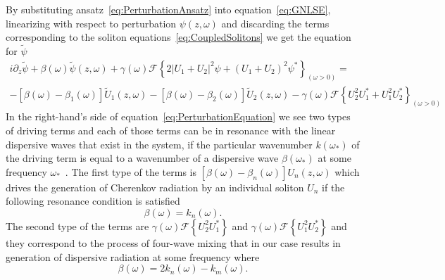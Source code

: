 \documentclass[aps, prl, twocolumn, superscriptaddress, final]{revtex4}
\newcommand{\abs}[1]{\left| #1 \right|}
\begin{document}
\begin{widetext}
By substituting ansatz~\eqref{eq:PerturbationAnsatz} into equation~\eqref{eq:GNLSE}, linearizing with respect to perturbation $\psi(z, \omega)$ and discarding the terms corresponding to the soliton equations~\eqref{eq:CoupledSolitons} we get the equation for $\tilde \psi$
\begin{multline}
  \label{eq:PerturbationEquation}
  i \partial_{z} \tilde \psi
    + \beta(\omega) \tilde \psi(z, \omega)
    + \gamma(\omega) \mathcal{F}\left\{
      2 \abs{U_{1} + U_{2}}^{2} \psi +
      \left( U_{1} + U_{2} \right)^{2} \psi^{*}
    \right\}_{(\omega > 0)} = \\
    - \left[ \beta(\omega) - \beta_{1}(\omega) \right] \tilde U_{1}(z, \omega)
    - \left[ \beta(\omega) - \beta_{2}(\omega) \right] \tilde U_{2}(z, \omega)
    - \gamma(\omega) \mathcal{F} \left\{
      U_{2}^{2} U_{1}^{*} + U_{1}^{2} U_{2}^{*}
    \right\}_{(\omega > 0)}
\end{multline}
In the right-hand's side of equation~\eqref{eq:PerturbationEquation} we see two types of driving terms and each of those terms can be in resonance with the linear dispersive waves that exist in the system, if the particular wavenumber $k(\omega_{*})$ of the driving term is equal to a wavenumber of a dispersive wave $\beta(\omega_{*})$ at some frequency $\omega_{*}$~\cite{akhmediev1995cherenkov, yulin2004four}. The first type of the terms is $\left[ \beta(\omega) - \beta_{n}(\omega) \right] U_{n}(z, \omega)$ which drives the generation of Cherenkov radiation by an individual soliton $U_{n}$ if the following resonance condition is satisfied
\begin{equation}
  \label{eq:CherenkovRadiationResonanceCondition}
  \beta(\omega) = k_{n}(\omega).
\end{equation}
The second type of the terms are $\gamma(\omega) \mathcal{F}\left\{ U_{2}^{2} U_{1}^{*} \right\}$ and $\gamma(\omega) \mathcal{F}\left\{ U_{1}^{2} U_{2}^{*} \right\}$ and they correspond to the process of four-wave mixing that in our case results in generation of dispersive radiation at some frequency where
\begin{equation}
  \label{eq:FWMRadiationResonanceCondition}
  \beta(\omega) = 2 k_{n}(\omega)  - k_{m}(\omega).
\end{equation}


\end{widetext}
\end{document}
